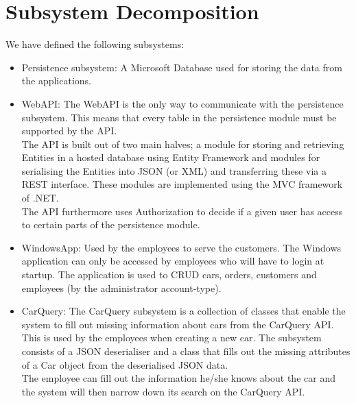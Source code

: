 \section{Subsystem Decomposition}
We have defined the following subsystems:
\begin{itemize}
	\item Persistence subsystem: A Microsoft Database used for storing the data from the applications.
	\item WebAPI: The WebAPI is the only way to communicate with the persistence subsystem. This means that every table in the persistence module must be supported by the API. \\
	The API is built out of two main halves; a module for storing and retrieving Entities in a hosted database using Entity Framework and modules for serialising the Entities into JSON (or XML) and transferring these via a REST interface. These modules are implemented using the MVC framework of .NET. \\
	The API furthermore uses Authorization to decide if a given user has access to certain parts of the persistence module.
	\item WindowsApp: Used by the employees to serve the customers. The Windows application can only be accessed by employees who will have to login at startup. The application is used to CRUD cars, orders, customers and employees (by the administrator account-type).
	\item CarQuery: The CarQuery subsystem is a collection of classes that enable the system to fill out missing information about cars from the CarQuery API. \\
	This is used by the employees when creating a new car. The subsystem consists of a JSON deserialiser and a class that fills out the missing attributes of a Car object from the deserialised JSON data. \\
	The employee can fill out the information he/she knows about the car and the system will then narrow down its search on the CarQuery API. 
\end{itemize}